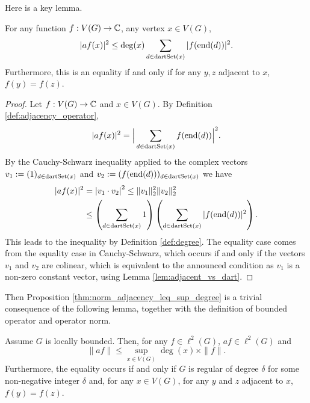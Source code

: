 Here is a key lemma.

\begin{lemma}
  \label{lem:bound_a_degree_x}
  For any function $f : V(G) \rightarrow \mathbb{C}$, any vertex $x \in V(G)$,
  \begin{equation}
    |af(x)|^2
    \leq \deg(x)
    \sum_{d \in \mathrm{dartSet}(x)} |f(\mathrm{end}(d))|^2.
  \end{equation}
  Furthermore, this is an equality if and only if
  for any $y, z$ adjacent to $x$, $f(y) = f(z)$.
\end{lemma}

\begin{proof}
  Let $f : V(G) \rightarrow \mathbb{C}$ and $x \in V(G)$.
  By Definition \ref{def:adjacency_operator},
  \begin{equation}
    |af(x)|^2
    = \Big| \sum_{d \in \mathrm{dartSet}(x)} f(\mathrm{end}(d))\Big|^2.
  \end{equation}
  By the Cauchy-Schwarz inequality applied to the complex vectors
  $v_1 := (1)_{d \in \mathrm{dartSet}(x)}$ and $v_2 := (f(\mathrm{end}(d)))_{d \in \mathrm{dartSet}(x)}$
  we have
  \begin{align*}
    |af(x)|^2
    & = \left| v_1 \cdot v_2 \right|^2
    \leq \|v_1\|_2^2 \|v_2\|_2^2 \\
    &\leq
    \left( \sum_{d \in \mathrm{dartSet}(x)} 1
    \right)
    \left( \sum_{d \in \mathrm{dartSet}(x)} |f(\mathrm{end}(d))|^2
    \right).
  \end{align*}
  This leads to the inequality by Definition \ref{def:degree}.
  The equality case comes from the equality case in Cauchy-Schwarz, which occurs if
  and only if the vectors $v_1$ and $v_2$
  are colinear, which
  is equivalent to the announced condition as $v_1$ is a non-zero constant vector,
  using Lemma \ref{lem:adjacent_vs_dart}.
\end{proof}

Then Proposition \ref{thm:norm_adjacency_leq_sup_degree} is a trivial consequence of the
following lemma, together with the definition of bounded operator and operator norm.

\begin{lemma}
  \label{lem:bound_a_sup_degree}
  Assume $G$ is locally bounded. Then, for any $f \in \ell^2(G)$,
  $a f \in \ell^2(G)$ and
  \begin{equation}
    \|a f\| \leq \sup_{x \in V(G)} \deg(x) \times \|f\|.
  \end{equation}
  Furthermore, the equality occurs if and only if $G$ is regular of degree $\delta$ for some
  non-negative integer $\delta$
  and, for any $x \in V(G)$, for any $y$ and $z$ adjacent to $x$, $f(y)=f(z)$.
\end{lemma}

